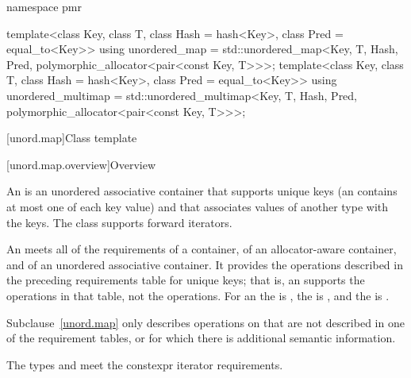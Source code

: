 \begin{codeblock}
{  namespace pmr {
    template<class Key,
             class T,
             class Hash = hash<Key>,
             class Pred = equal_to<Key>>
      using unordered_map =
        std::unordered_map<Key, T, Hash, Pred,
                           polymorphic_allocator<pair<const Key, T>>>;
    template<class Key,
             class T,
             class Hash = hash<Key>,
             class Pred = equal_to<Key>>
      using unordered_multimap =
        std::unordered_multimap<Key, T, Hash, Pred,
                                polymorphic_allocator<pair<const Key, T>>>;

  }
}
\end{codeblock}

[unord.map]{Class template }%

[unord.map.overview]{Overview}

\pnum
{}%
%
An  is an unordered associative container that
supports unique keys (an  contains at most one of each
key value) and that associates values of another type
 with the keys.
The  class
supports forward iterators.

\pnum
An  meets all of the requirements
of a container,
of an allocator-aware container, and
of an unordered associative container.
It provides the operations described in the preceding requirements table for unique keys;
that is, an  supports the  operations in that table,
not the  operations.
For an  the  is ,
the  is ,
and the  is .

\pnum
Subclause~\ref{unord.map} only describes operations on  that
are not described in one of the requirement tables, or for which there
is additional semantic information.

\pnum
The types  and  meet
the constexpr iterator requirements.

